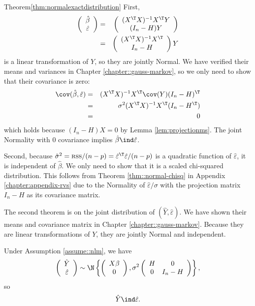 \begin{myproof}{Theorem}{\ref{thm:normalexactdistribution}}
First, 
\begin{eqnarray*}
\left(\begin{array}{c}
\hat{\beta}\\
\hat{\varepsilon}
\end{array}\right)
&=&
\left(\begin{array}{c}
(X^{\T}X)^{-1}X^{\T}Y\\
(I_{n}-H)Y
\end{array}\right) \\
&=&\left(\begin{array}{c}
(X^{\T}X)^{-1}X^{\T}\\
I_{n}-H
\end{array}\right)Y
\end{eqnarray*}
is a linear transformation of $Y$, so they are jointly Normal. We have verified their means and variances in Chapter \ref{chapter::gauss-markov}, so we only need to show that their covariance is zero:
\begin{eqnarray*}
\cov(\hat{\beta},\hat{\varepsilon})
&=&(X^{\T}X)^{-1}X^{\T}\cov(Y)(I_{n}-H)^{\T}\\
&=&\sigma^{2}(X^{\T}X)^{-1}X^{\T}(I_{n}-H^{\T}) \\
&=&0
\end{eqnarray*}
which holds because $(I_{n}-H)X=0$ by Lemma \ref{lem:projectionms}.
The joint Normality with 0 covariance implies $\hat{\beta}\ind\hat{\varepsilon}$. 
 

Second, because $\hat{\sigma}^{2}=\textsc{rss}/(n-p)=\hat{\varepsilon}^{\T}\hat{\varepsilon}/(n-p)$
is a quadratic function of $\hat{\varepsilon}$, it is independent
of $\hat{\beta}$. We only need to show that it is a scaled chi-squared
distribution. This follows from Theorem \ref{thm::normal-chisq} in Appendix \ref{chapter:appendix-rvs}  due to the Normality of $\hat{\varepsilon}/\sigma$
with the projection matrix $I_{n}-H$ as its covariance matrix. 
\end{myproof}



The second theorem is on the joint distribution of $(\hat{Y},\hat{\varepsilon}).$
We have shown their means and covariance matrix in Chapter \ref{chapter::gauss-markov}.
Because they are linear transformations of $Y$, they are jointly Normal
and independent. 
\begin{theorem}\label{thm::gaussianlm-independence-ye}
Under Assumption \ref{assume::nlm}, we have 
\[
\left(\begin{array}{c}
\hat{Y}\\
\hat{\varepsilon}
\end{array}\right)\sim\N\left\{ \left(\begin{array}{c}
X\beta\\
0
\end{array}\right),\sigma^{2}\left(\begin{array}{cc}
H & 0\\
0 & I_{n}-H
\end{array}\right)\right\} ,
\]
so 
$$
\hat{Y}\ind\hat{\varepsilon}.
$$
\end{theorem}
 

